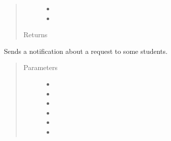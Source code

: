 \documentclass[letterpaper,10pt,english]{sphinxmanual}
\begin{document}
\begin{fulllineitems}
\begin{fulllineitems}
\begin{quote}
\begin{description}
\begin{itemize}
\item {} 
 \textendash{} 

\item {} 
 \textendash{} 

\end{itemize}

\item[{Returns}] \leavevmode


\end{description}\end{quote}

\end{fulllineitems}


\begin{fulllineitems}
\label{\detokenize{apidoc/utdesign_procurement:utdesign_procurement.emailer.EmailHandler.notifyStudent}}
Sends a notification about a request to some students.
\begin{quote}\begin{description}
\item[{Parameters}] \leavevmode\begin{itemize}
\item {} 
 \textendash{} 

\item {} 
 \textendash{} 

\item {} 
 \textendash{} 

\item {} 
 \textendash{} 

\item {} 
 \textendash{} 

\item {} 
 \textendash{} 

\end{itemize}


\end{description}
\end{quote}
\end{fulllineitems}
\end{fulllineitems}
\end{document}
